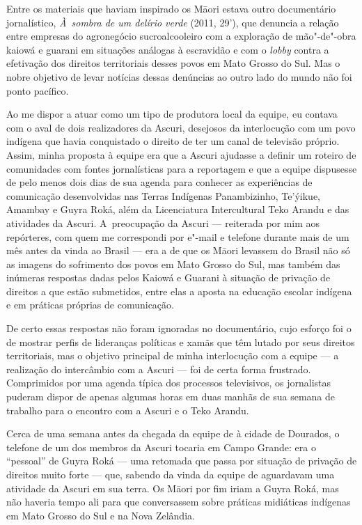 Entre os materiais que haviam inspirado os M\=aori estava outro
documentário jornalístico, \emph{À~sombra de um delírio verde} (2011, 29’), que denuncia a relação entre empresas do agronegócio sucroalcooleiro
com a exploração de mão"-de"-obra kaiowá e guarani em situações análogas
à escravidão e com o \emph{lobby} contra a efetivação dos direitos
territoriais desses povos em Mato Grosso do Sul. Mas o nobre objetivo
de levar notícias dessas denúncias ao outro lado do mundo não foi ponto
pacífico.

Ao me dispor a atuar como um tipo de produtora local da equipe, eu
contava com o aval de dois realizadores da Ascuri, desejosos da
interlocução com um povo indígena que havia conquistado o direito de
ter um canal de televisão próprio. Assim, minha proposta à equipe era
que a Ascuri ajudasse a definir um roteiro de comunidades com fontes
jornalísticas para a reportagem e que a equipe dispusesse de pelo menos
dois dias de sua agenda para conhecer as experiências de comunicação
desenvolvidas nas Terras Indígenas Panambizinho, Te’ýikue, Amambay e
Guyra Roká, além da Licenciatura Intercultural Teko Arandu e das
atividades da Ascuri. A~preocupação da Ascuri --- reiterada por mim aos
repórteres, com quem me correspondi por e"-mail e telefone durante mais
de um mês antes da vinda ao Brasil --- era a de que os M\=aori levassem
do Brasil não só as imagens do sofrimento dos povos em Mato Grosso do
Sul, mas também das inúmeras respostas dadas pelos Kaiowá e Guarani à
situação de privação de direitos a que estão submetidos, entre elas a
aposta na educação escolar indígena e em práticas próprias de
comunicação. 

De certo essas respostas não foram ignoradas no documentário, cujo
esforço foi o de mostrar perfis de lideranças políticas e xamãs que têm
lutado por seus direitos territoriais, mas o objetivo principal de
minha interlocução com a equipe --- a realização do intercâmbio com a
Ascuri --- foi de certa forma frustrado. Comprimidos por uma agenda
típica dos processos televisivos, os jornalistas puderam dispor de
apenas algumas horas em duas manhãs de sua semana de trabalho para o
encontro com a Ascuri e o Teko Arandu.

Cerca de uma semana antes da chegada da equipe de  à cidade de
Dourados, o telefone de um dos membros da Ascuri tocaria em Campo
Grande: era o ``pessoal'' de Guyra Roká --- uma retomada que passa por
situação de privação de direitos muito forte --- que, sabendo da vinda da
equipe de  aguardavam uma atividade da Ascuri em sua terra. Os
M\=aori por fim iriam a Guyra Roká, mas não haveria tempo ali para que
conversassem sobre práticas midiáticas indígenas em Mato Grosso do Sul
e na Nova Zelândia. 

